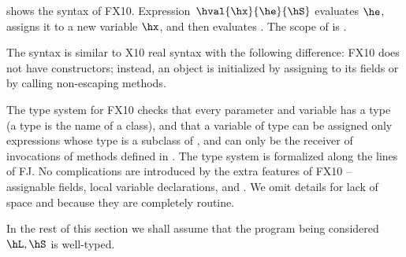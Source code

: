  shows the syntax of FX10.
Expression~$\hval{\hx}{\he}{\hS}$ evaluates $\he$, assigns it to a
new variable $\hx$, and then evaluates \hS. The scope of \hx{} is \hS.

The syntax is similar to X10 real syntax with the following difference:
FX10 does not have constructors; instead, an object is initialized by assigning to its fields or
    by calling
    non-escaping methods.



The type system for FX10 checks that every parameter and variable has
a type (a type is the name of a class), and that a variable of type
\hC can be assigned only expressions whose type is a subclass of \hC,
and can only be the receiver of invocations of methods defined in
\hC. The type system is formalized along the lines of FJ. No
complications are introduced by the extra features of FX10 --
assignable fields, local variable declarations, \hfinish{} and
\hasync{}. We omit details for lack of space and because they are
completely routine.

In the rest of this section we shall assume that the program being
considered $\hL,\hS$ is well-typed.

